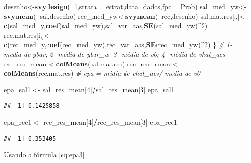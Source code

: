 \documentclass[]{book}
\newenvironment{Shaded}{\begin{snugshade}}{\end{snugshade}}
\newcommand{\KeywordTok}[1]{\textcolor[rgb]{0.13,0.29,0.53}{\textbf{#1}}}
\newcommand{\DataTypeTok}[1]{\textcolor[rgb]{0.13,0.29,0.53}{#1}}
\newcommand{\DecValTok}[1]{\textcolor[rgb]{0.00,0.00,0.81}{#1}}
\newcommand{\StringTok}[1]{\textcolor[rgb]{0.31,0.60,0.02}{#1}}
\newcommand{\CommentTok}[1]{\textcolor[rgb]{0.56,0.35,0.01}{\textit{#1}}}
\newcommand{\OperatorTok}[1]{\textcolor[rgb]{0.81,0.36,0.00}{\textbf{#1}}}
\newcommand{\NormalTok}[1]{#1}
\theoremstyle{definition}
\theoremstyle{definition}
\theoremstyle{definition}
\theoremstyle{remark}
\begin{document}
\begin{Shaded}
\begin{Highlighting}[]
\NormalTok{desenho<-}\KeywordTok{svydesign}\NormalTok{(}\OperatorTok{~}\DecValTok{1}\NormalTok{,}\DataTypeTok{strata=}\OperatorTok{~}\NormalTok{estrat,}\DataTypeTok{data=}\NormalTok{dados,}\DataTypeTok{fpc=}\OperatorTok{~}\NormalTok{Prob)}
\NormalTok{sal_med_yw<-}\KeywordTok{svymean}\NormalTok{(}\OperatorTok{~}\NormalTok{sal,desenho)}
\NormalTok{rec_med_yw<-}\KeywordTok{svymean}\NormalTok{(}\OperatorTok{~}\NormalTok{rec,desenho)}
\NormalTok{sal.mat.res[i,]<-}\KeywordTok{c}\NormalTok{(sal_med_y,}\KeywordTok{coef}\NormalTok{(sal_med_yw),sal_var_aas,}\KeywordTok{SE}\NormalTok{(sal_med_yw)}\OperatorTok{^}\DecValTok{2}\NormalTok{)}
\NormalTok{rec.mat.res[i,]<-}\KeywordTok{c}\NormalTok{(rec_med_y,}\KeywordTok{coef}\NormalTok{(rec_med_yw),rec_var_aas,}\KeywordTok{SE}\NormalTok{(rec_med_yw)}\OperatorTok{^}\DecValTok{2}\NormalTok{)}
\NormalTok{\}}
\CommentTok{# 1-media de ybar; 2- média de ybar_w; 3- média de v0; 4- média de vhat_aes}
\NormalTok{sal_res_mean <-}\KeywordTok{colMeans}\NormalTok{(sal.mat.res)}
\NormalTok{rec_res_mean <-}\StringTok{ }\KeywordTok{colMeans}\NormalTok{(rec.mat.res)}
\CommentTok{# epa = média de vhat_aes/ média de v0}

\NormalTok{epa_sal1 <-}\StringTok{ }\NormalTok{sal_res_mean[}\DecValTok{4}\NormalTok{]}\OperatorTok{/}\NormalTok{sal_res_mean[}\DecValTok{3}\NormalTok{]}
\NormalTok{epa_sal1}
\end{Highlighting}
\end{Shaded}

\begin{verbatim}
## [1] 0.1425858
\end{verbatim}

\begin{Shaded}
\begin{Highlighting}[]
\NormalTok{epa_rec1 <-}\StringTok{ }\NormalTok{rec_res_mean[}\DecValTok{4}\NormalTok{]}\OperatorTok{/}\NormalTok{rec_res_mean[}\DecValTok{3}\NormalTok{]}
\NormalTok{epa_rec1}
\end{Highlighting}
\end{Shaded}

\begin{verbatim}
## [1] 0.353405
\end{verbatim}

Usando a fórmula \eqref{eq:epa3}
\end{document}
